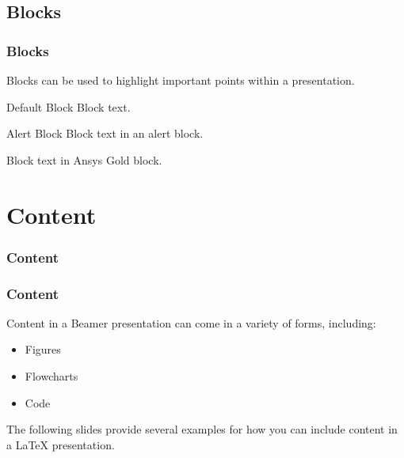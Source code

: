 \documentclass[t]{beamer}
\begin{document}
\subsection{Blocks}
\begin{frame}
  \frametitle{Blocks}

  Blocks can be used to highlight important points within a presentation.

  \begin{block}{Default Block}
    Block text.
  \end{block}

  \begin{alertblock}{Alert Block}
    Block text in an alert block.
  \end{alertblock}

  \begin{examples}
    Block text in Ansys Gold block.
  \end{examples}

\end{frame}


\section{Content}

\begin{frame}
  \frametitle{Content}
  \tableofcontents[currentsection]
  \vspace{200pt}  %
\end{frame}


\begin{frame}
  \frametitle{Content}
  Content in a Beamer presentation can come in a variety of forms, including:

  \begin{itemize}
    \item{Figures}
    \item{Flowcharts}
    \item{Code}
  \end{itemize}

  The following slides provide several examples for how you can include content
  in a LaTeX presentation.

\end{frame}

\end{document}
